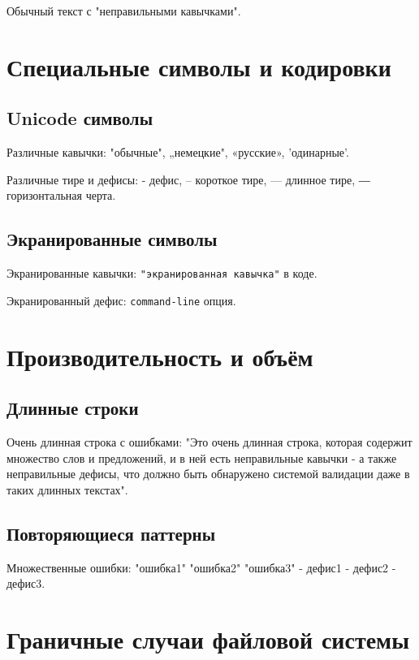 \documentclass[12pt,a4paper]{article}
\begin{document}
Обычный текст с "неправильными кавычками". %


\section{Специальные символы и кодировки}

\subsection{Unicode символы}

Различные кавычки: "обычные", „немецкие", «русские», 'одинарные'.

Различные тире и дефисы: - дефис, – короткое тире, — длинное тире, ― горизонтальная черта.

\subsection{Экранированные символы}

Экранированные кавычки: \texttt{"экранированная кавычка"} в коде.

Экранированный дефис: \texttt{command-line} опция.

\section{Производительность и объём}

\subsection{Длинные строки}

Очень длинная строка с ошибками: "Это очень длинная строка, которая содержит множество слов и предложений, и в ней есть неправильные кавычки - а также неправильные дефисы, что должно быть обнаружено системой валидации даже в таких длинных текстах".

\subsection{Повторяющиеся паттерны}

Множественные ошибки: "ошибка1" "ошибка2" "ошибка3" - дефис1 - дефис2 - дефис3.

\section{Граничные случаи файловой системы}
\end{document}

